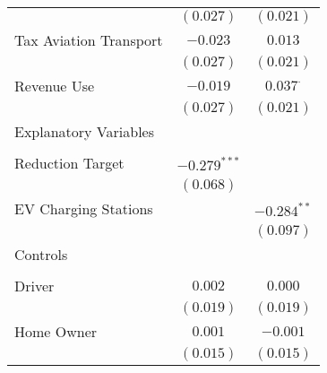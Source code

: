 \begin{center}
\begin{tiny}
\begin{longtable}{l@{} c@{} c@{}}
                                                                           & $(0.027)$        & $(0.021)$        \\
\quad Tax Aviation Transport                                               & $-0.023$         & $0.013$          \\
                                                                           & $(0.027)$        & $(0.021)$        \\
\quad Revenue Use                                                          & $-0.019$         & $0.037^{\cdot}$  \\
                                                                           & $(0.027)$        & $(0.021)$        \\
Explanatory Variables                                                      &                  &                  \\
                                                                           &                  &                  \\
\quad Reduction Target                                                     & $-0.279^{***}$   &                  \\
                                                                           & $(0.068)$        &                  \\
\quad EV Charging Stations                                                 &                  & $-0.284^{**}$    \\
                                                                           &                  & $(0.097)$        \\
Controls                                                                   &                  &                  \\
                                                                           &                  &                  \\
\quad Driver                                                               & $0.002$          & $0.000$          \\
                                                                           & $(0.019)$        & $(0.019)$        \\
\quad Home Owner                                                           & $0.001$          & $-0.001$         \\
                                                                           & $(0.015)$        & $(0.015)$        \\

\end{longtable}
\end{tiny}
\end{center}
